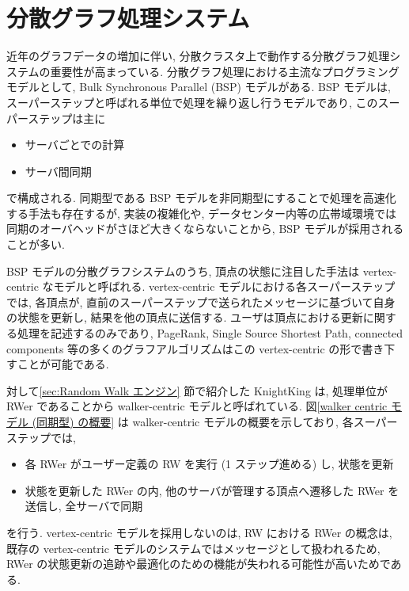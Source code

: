 \section{分散グラフ処理システム}\label{sec:分散グラフ処理システム}

近年のグラフデータの増加に伴い, 分散クラスタ上で動作する分散グラフ処理システムの重要性が高まっている. 分散グラフ処理における主流なプログラミングモデルとして, Bulk Synchronous Parallel (BSP) モデルがある. BSP モデルは, スーパーステップと呼ばれる単位で処理を繰り返し行うモデルであり, このスーパーステップは主に
\begin{itemize}
    \item サーバごとでの計算
    \item サーバ間同期
\end{itemize}
で構成される. 同期型である BSP モデルを非同期型にすることで処理を高速化する手法も存在する\cite{BAP}\cite{AAP}\cite{Gluon-Async}が, 実装の複雑化や, データセンター内等の広帯域環境では同期のオーバヘッドがさほど大きくならないことから, BSP モデルが採用されることが多い. 

BSP モデルの分散グラフシステムのうち, 頂点の状態に注目した手法\cite{Pregel}\cite{10.1145/2741948.2741970}\cite{10.5555/2387880.2387883}\cite{10.5555/3026877.3026901}\cite{Gluon}は vertex-centric なモデルと呼ばれる. vertex-centric モデルにおける各スーパーステップでは, 各頂点が, 直前のスーパーステップで送られたメッセージに基づいて自身の状態を更新し, 結果を他の頂点に送信する. ユーザは頂点における更新に関する処理を記述するのみであり, PageRank, Single Source Shortest Path, connected components 等の多くのグラフアルゴリズムはこの vertex-centric の形で書き下すことが可能である. 

対して\ref{sec:Random Walk エンジン} 節で紹介した KnightKing は, 処理単位が RWer であることから walker-centric モデルと呼ばれている. 図\ref{walker centric モデル (同期型) の概要} は walker-centric モデルの概要を示しており, 各スーパーステップでは, 
\begin{itemize}
    \item 各 RWer がユーザー定義の RW を実行 (1 ステップ進める) し, 状態を更新
    \item 状態を更新した RWer の内, 他のサーバが管理する頂点へ遷移した RWer を送信し, 全サーバで同期
\end{itemize}
を行う. vertex-centric モデルを採用しないのは, RW における RWer の概念は, 既存の vertex-centric モデルのシステムではメッセージとして扱われるため, RWer の状態更新の追跡や最適化のための機能が失われる可能性が高いためである. 

